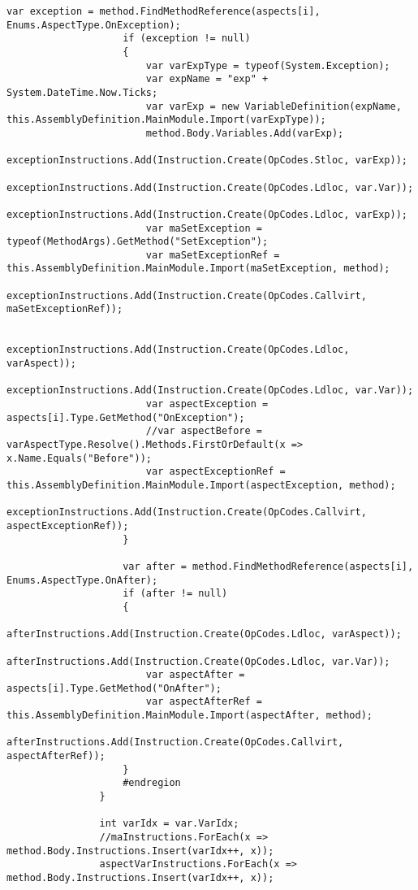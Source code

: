 \begin{lstlisting}[caption={../buffalo/Injectors/MethodBoundaryInjector.cs}, label=../buffalo/Injectors/MethodBoundaryInjector.cs, frame=tb, basicstyle=\scriptsize]
                    var exception = method.FindMethodReference(aspects[i], Enums.AspectType.OnException);
                    if (exception != null)
                    {
                        var varExpType = typeof(System.Exception);
                        var expName = "exp" + System.DateTime.Now.Ticks;
                        var varExp = new VariableDefinition(expName, this.AssemblyDefinition.MainModule.Import(varExpType));
                        method.Body.Variables.Add(varExp);
                        exceptionInstructions.Add(Instruction.Create(OpCodes.Stloc, varExp));
                        exceptionInstructions.Add(Instruction.Create(OpCodes.Ldloc, var.Var));
                        exceptionInstructions.Add(Instruction.Create(OpCodes.Ldloc, varExp));
                        var maSetException = typeof(MethodArgs).GetMethod("SetException");
                        var maSetExceptionRef = this.AssemblyDefinition.MainModule.Import(maSetException, method);
                        exceptionInstructions.Add(Instruction.Create(OpCodes.Callvirt, maSetExceptionRef));

                        exceptionInstructions.Add(Instruction.Create(OpCodes.Ldloc, varAspect));
                        exceptionInstructions.Add(Instruction.Create(OpCodes.Ldloc, var.Var));
                        var aspectException = aspects[i].Type.GetMethod("OnException");
                        //var aspectBefore = varAspectType.Resolve().Methods.FirstOrDefault(x => x.Name.Equals("Before"));
                        var aspectExceptionRef = this.AssemblyDefinition.MainModule.Import(aspectException, method);
                        exceptionInstructions.Add(Instruction.Create(OpCodes.Callvirt, aspectExceptionRef));
                    }

                    var after = method.FindMethodReference(aspects[i], Enums.AspectType.OnAfter);
                    if (after != null)
                    {
                        afterInstructions.Add(Instruction.Create(OpCodes.Ldloc, varAspect));
                        afterInstructions.Add(Instruction.Create(OpCodes.Ldloc, var.Var));
                        var aspectAfter = aspects[i].Type.GetMethod("OnAfter");
                        var aspectAfterRef = this.AssemblyDefinition.MainModule.Import(aspectAfter, method);
                        afterInstructions.Add(Instruction.Create(OpCodes.Callvirt, aspectAfterRef));
                    }
                    #endregion
                }

                int varIdx = var.VarIdx;
                //maInstructions.ForEach(x => method.Body.Instructions.Insert(varIdx++, x));
                aspectVarInstructions.ForEach(x => method.Body.Instructions.Insert(varIdx++, x));


\end{lstlisting}
